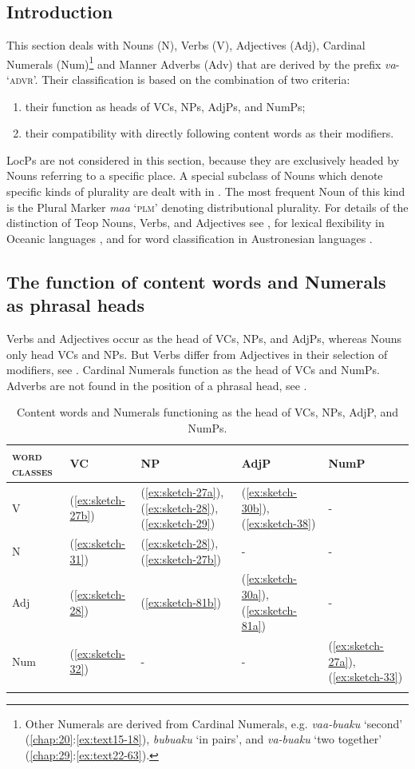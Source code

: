 \documentclass[output=paper]{langscibook}
\begin{document}
\subsection{Introduction}
This section deals with Nouns (N), Verbs (V), Adjectives (Adj), Cardinal Numerals (Num)\footnote{Other Numerals are derived from Cardinal Numerals, e.g. \textit{vaa-buaku} `second' (\ref{chap:20}:\ref{ex:text15-18}), \textit{bubuaku} `in pairs', and \textit{va-buaku} `two together' (\ref{chap:29}:\ref{ex:text22-63}).} and Manner Adverbs (Adv) that are derived by the prefix \textit{va}- `\textsc{advr}'. Their classification is based on the combination of two criteria:
\begin{enumerate}
    \item their function as heads of VCs, NPs, AdjPs, and NumPs;
    \item their compatibility with directly following content words as their modifiers.
\end{enumerate}
LocPs are not considered in this section, because they are exclusively headed by Nouns referring to a specific place. A special subclass of Nouns which denote specific kinds of plurality are dealt with in . The most frequent Noun of this kind is the Plural Marker \textit{maa} `\textsc{plm}' denoting distributional plurality. For details of the distinction of Teop Nouns, Verbs, and Adjectives see \textcite{Mosel:2017as}, for lexical flexibility in Oceanic languages \textcite{Lier:2016ka}, and for word classification in Austronesian languages \textcite{Mosel:2023sy}.
\subsection{The function of content words and Numerals as phrasal heads}\label{sec:funcnumhead}
Verbs and Adjectives occur as the head of VCs, NPs, and AdjPs, whereas Nouns only head VCs and NPs. But Verbs differ from Adjectives in their selection of modifiers, see . Cardinal Numerals function as the head of VCs and NumPs. Adverbs are not found in the position of a phrasal head, see .


\begin{table}
    \caption{Content words and Numerals functioning as the head of VCs, NPs, AdjP, and NumPs.} \label{tab:numhead}
\begin{tabularx}{\textwidth}{lXlXl}
    \lsptoprule
    \textsc{word classes}&VC&NP&AdjP&NumP\\
    \midrule
        V&(\ref{ex:sketch-27b})&(\ref{ex:sketch-27a}), (\ref{ex:sketch-28}), (\ref{ex:sketch-29})&(\ref{ex:sketch-30b}), (\ref{ex:sketch-38})&-\\
        N&(\ref{ex:sketch-31})&(\ref{ex:sketch-28}), (\ref{ex:sketch-27b})&-&-\\
        Adj&(\ref{ex:sketch-28})&(\ref{ex:sketch-81b})&(\ref{ex:sketch-30a}), (\ref{ex:sketch-81a})&-\\
        Num&(\ref{ex:sketch-32})&-&-&(\ref{ex:sketch-27a}), (\ref{ex:sketch-33})\\
    \lspbottomrule
\end{tabularx}
\end{table}
\end{document}
